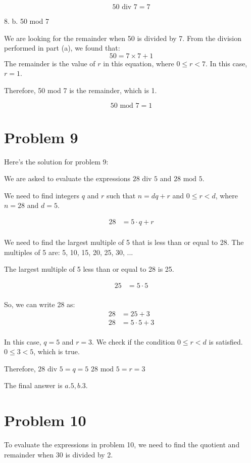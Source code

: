 \documentclass{article}
\begin{document}
$$
50 \text{ div } 7 = 7
$$

8. b. 50 mod 7

We are looking for the remainder when 50 is divided by 7.
From the division performed in part (a), we found that:
$$
50 = 7 \times 7 + 1
$$
The remainder is the value of $r$ in this equation, where $0 \le r < 7$. In this case, $r=1$.

Therefore, 50 mod 7 is the remainder, which is 1.

$$
50 \text{ mod } 7 = 1
$$

\newpage

\section*{Problem 9}
Here's the solution for problem 9:

We are asked to evaluate the expressions $28 \text{ div } 5$ and $28 \text{ mod } 5$.

We need to find integers $q$ and $r$ such that $n = dq + r$ and $0 \leq r < d$, where $n=28$ and $d=5$.

\begin{align*} \label{eq:1} 28 &= 5 \cdot q + r \\ \end{align*}

We need to find the largest multiple of 5 that is less than or equal to 28.
The multiples of 5 are: 5, 10, 15, 20, 25, 30, ...

The largest multiple of 5 less than or equal to 28 is 25.

\begin{align*} 25 &= 5 \cdot 5 \\ \end{align*}

So, we can write 28 as:
\begin{align*} 28 &= 25 + 3 \\ 28 &= 5 \cdot 5 + 3 \\ \end{align*}

In this case, $q = 5$ and $r = 3$.
We check if the condition $0 \leq r < d$ is satisfied.
$0 \leq 3 < 5$, which is true.

Therefore,
$28 \text{ div } 5 = q = 5$
$28 \text{ mod } 5 = r = 3$

The final answer is $\boxed{a. 5, b. 3}$.

\newpage

\section*{Problem 10}
To evaluate the expressions in problem 10, we need to find the quotient and remainder when 30 is divided by 2.
\end{document}
